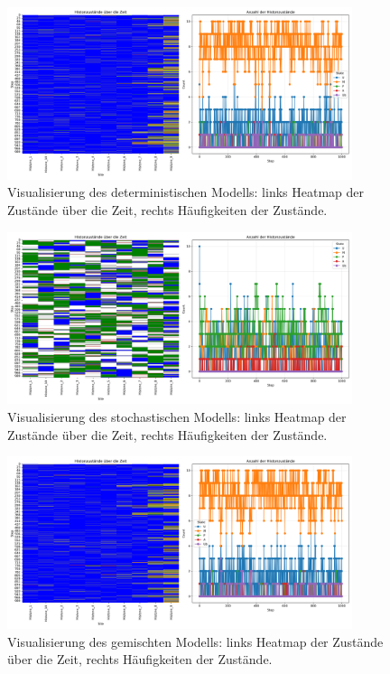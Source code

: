 \documentclass{SeminarV2}
\begin{document}
\begin{figure}[htbp]
\centering
\includegraphics[width=0.9\textwidth]{images/Histone_Prohaska_1000.png}
\caption{Visualisierung des deterministischen Modells: links Heatmap der Zustände über die Zeit, rechts Häufigkeiten der Zustände.}
\label{fig:P_1000}
\end{figure}

\begin{figure}[htbp]
\centering
\includegraphics[width=0.9\textwidth]{images/Histone_Markov_1000.png}
\caption{Visualisierung des stochastischen Modells: links Heatmap der Zustände über die Zeit, rechts Häufigkeiten der Zustände.}
\label{fig:M_1000}
\end{figure}

\begin{figure}[htbp]
  \centering
  \includegraphics[width=0.9\textwidth]{images/Histone_Prohaska_and_Markov_1000.png}
  \caption{Visualisierung des gemischten Modells: links Heatmap der Zustände über die Zeit, rechts Häufigkeiten der Zustände.}
  \label{fig:PM_1000}
\end{figure}
\end{document}
